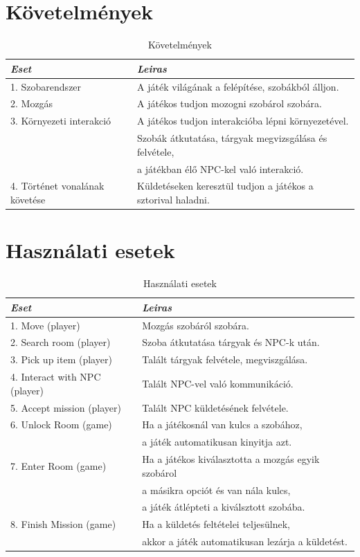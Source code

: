 \documentclass{scrarticle}
\begin{document}
\section{Követelmények}
\begin{table}[H] \centering
    \caption{Követelmények}\label{tab:requirements}
    \begin{tabular}{@{}ll@{}}
        \emph{Eset} & \emph{Leiras}\\ \hline
        1. Szobarendszer & A játék világának a felépítése, szobákból álljon.\\
        2. Mozgás & A játékos tudjon mozogni szobárol szobára.\\
        3. Környezeti interakció & A játékos tudjon interakcióba lépni környezetével.\\ & Szobák átkutatása, tárgyak megvizsgálása és felvétele,\\ & a játékban élő NPC-kel való interakció.\\
        4. Történet vonalának követése & Küldetéseken keresztül tudjon a játékos a sztorival haladni.\\
    \end{tabular}
\end{table}

\section{Használati esetek}
\begin{table}[H] \centering
    \caption{Használati esetek}\label{tab:usecasetable}
    \begin{tabular}{@{}ll@{}}
        \emph{Eset} & \emph{Leiras}\\ \hline
        1. Move (player)         & Mozgás szobáról szobára.\\
        2. Search room (player)  & Szoba átkutatása tárgyak és NPC-k után.\\
        3. Pick up item (player) & Talált tárgyak felvétele, megviszgálása.\\
        4. Interact with NPC (player) & Talált NPC-vel való kommunikáció.\\
        5. Accept mission (player) & Talált NPC küldetésének felvétele.\\ 
        6. Unlock Room (game) & Ha a játékosnál van kulcs a szobához,\\ & a játék automatikusan kinyitja azt.\\
        7. Enter Room (game) & Ha a játékos kiválasztotta a mozgás egyik szobárol\\ & a másikra opciót és van nála kulcs,\\ & a játék átlépteti a kiválsztott szobába.\\
        8. Finish Mission (game) & Ha a küldetés feltételei teljesülnek,\\ & akkor a játék automatikusan lezárja a küldetést.\\ 
    \end{tabular}
\end{table}
\end{document}

